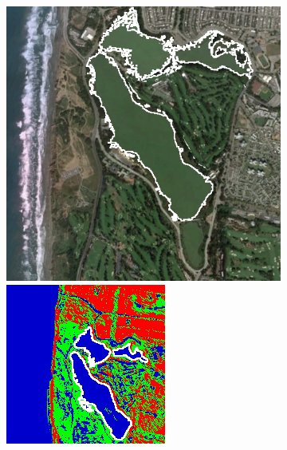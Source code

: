 \begin{figure}[!b]
\begin{subfigure}[t]{0.19\textwidth}
\caption{}
\label{fig:cla2_b}
\end{subfigure}
\begin{subfigure}[t]{0.19\textwidth}
\includegraphics[width=\columnwidth]{Figures/ALOS2_SF_3Class/Lake} 
\vspace{0.2cm}
\includegraphics[width=\columnwidth]{Figures/ALOS2_SF_3Class/Lake_cl}

\end{subfigure}
\end{figure}
